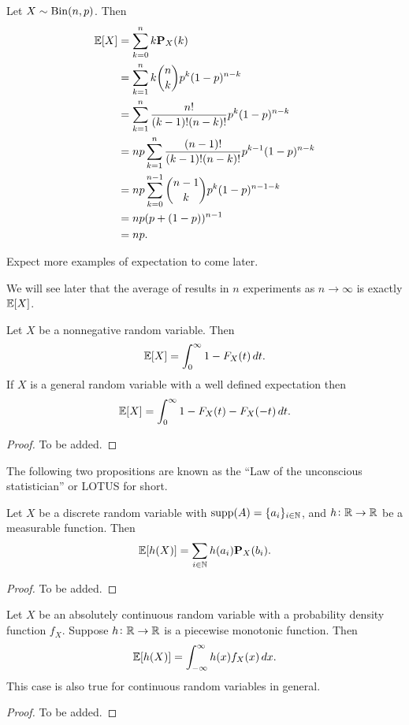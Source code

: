 \documentclass[11pt,a4paper]{article}
\begin{document}
  \begin{example}
    Let $X \sim \operatorname{Bin}(n,p)$. Then
    \begin{align*}
      \mathbb{E}[X] &= \sum_{k=0}^{n} k \mathbf{P}_{X}(k) \\
      &= \sum_{k=1}^{n} k \binom{n}{k} p^k (1-p)^{n-k} \\
      &= \sum_{k=1}^{n} \frac{n!}{(k-1)!(n-k)!} p^{k} (1-p)^{n-k} \\
      &= n p \sum_{k=1}^{n} \frac{(n-1)!}{(k-1)!(n-k)!} p^{k-1} (1-p)^{n-k} \\
      &= n p\sum_{k=0}^{n-1}{\binom{n-1}{k}}p^{k}(1-p)^{n-1-k} \\
      &= n p(p+(1-p))^{n-1} \\
      &= n p.
    \end{align*}
  \end{example}

  Expect more examples of expectation to come later.

  We will see later that the average of results in $n$ experiments as
  $n \to \infty$ is exactly $\mathbb{E}[X]$.

  \begin{proposition}
    Let $X$ be a nonnegative random variable. Then
    \[
      \mathbb{E}[X] = \int_{0}^{\infty} 1 - F_X(t)\,dt.
    \]
    If $X$ is a general random variable with a well defined expectation
    then
    \[
      \mathbb{E}[X] = \int_{0}^{\infty} 1 - F_X(t) - F_X(-t)\,dt.
    \]
  \end{proposition}
  \begin{proof}
    To be added.
  \end{proof}

  The following two propositions are known as the 
  ``Law of the unconscious statistician'' or LOTUS for short.
  \begin{proposition}
    Let $X$ be a discrete random variable with $\operatorname{supp}(A) = \{a_i\}_{i \in \mathbb{N}}$,
    and $h \colon \mathbb{R} \to \mathbb{R}$ be a measurable function. Then
    \[
      \mathbb{E}[h(X)] = \sum_{i \in \mathbb{N}} h(a_i) \mathbf{P}_X(b_i).
    \]
  \end{proposition}
  \begin{proof}
    To be added.
  \end{proof}
  
  \begin{proposition}
    Let $X$ be an absolutely continuous random variable with a probability
    density function $f_X$.
    Suppose $h \colon \mathbb{R} \to \mathbb{R}$ is a piecewise monotonic function. Then
    \[
      \mathbb{E}[h(X)] = \int_{-\infty}^{\infty} h(x) f_X(x)\,dx.
    \]
    This case is also true for continuous random variables in general.
  \end{proposition}
  \begin{proof}
    To be added.
  \end{proof}
  
\end{document}
